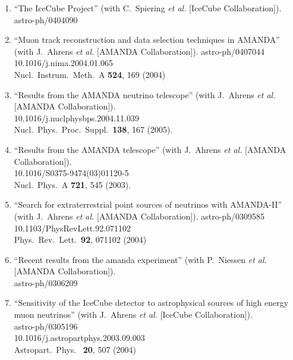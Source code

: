\begin{enumerate}
\item ``The IceCube Project'' (with C.~Spiering {\it et al.}  [IceCube
  Collaboration]).  \\{}astro-ph/0404090
  


\item ``Muon track reconstruction and data selection techniques in AMANDA'' (with J.~Ahrens {\it et al.}  [AMANDA Collaboration]). astro-ph/0407044 \\{}10.1016/j.nima.2004.01.065
  \\{}Nucl.\ Instrum.\ Meth.\ A {\bf 524}, 169 (2004) %


\item ``Results from the AMANDA neutrino telescope'' (with J.~Ahrens {\it et
  al.}  [AMANDA Collaboration]).  \\{}10.1016/j.nuclphysbps.2004.11.039
  \\{}Nucl.\ Phys.\ Proc.\ Suppl.\ {\bf 138}, 167 (2005). %


\item ``Results from the AMANDA telescope'' (with J.~Ahrens {\it et al.}
  [AMANDA Collaboration]).  \\{}10.1016/S0375-9474(03)01120-5
  \\{}Nucl.\ Phys.\ A {\bf 721}, 545 (2003). %


\item ``Search for extraterrestrial point sources of neutrinos with
  AMANDA-II'' (with J.~Ahrens {\it et al.}  [AMANDA Collaboration]). astro-ph/0309585 \\{}10.1103/PhysRevLett.92.071102
  \\{}Phys.\ Rev.\ Lett.\ {\bf 92}, 071102 (2004) %


\item ``Recent results from the amanda experiment'' (with P.~Niessen {\it et
  al.}  [AMANDA Collaboration]).  \\{}astro-ph/0306209
  


\item ``Sensitivity of the IceCube detector to astrophysical sources of high
  energy muon neutrinos'' (with J.~Ahrens {\it et al.}  [IceCube
    Collaboration]).  \\{}astro-ph/0305196
  \\{}10.1016/j.astropartphys.2003.09.003 \\{}Astropart.\ Phys.\ {\bf
    20}, 507 (2004) %



\end{enumerate}
